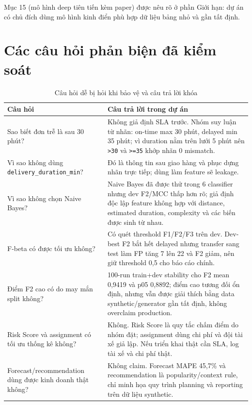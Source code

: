 \documentclass[12pt,a4paper,oneside]{report}
\newcommand{\code}[1]{\nolinkurl{#1}}
\begin{document}
Mục 15 (mô hình deep tiên tiến kèm paper) được nêu rõ ở phần Giới hạn: dự án có
chủ đích dùng mô hình kinh điển phù hợp dữ liệu bảng nhỏ và gần tất định.

\section{Các câu hỏi phản biện đã kiểm soát}

\begin{table}[H]
\centering
\small
\caption{Câu hỏi dễ bị hỏi khi bảo vệ và câu trả lời khóa}
\begin{tabularx}{\textwidth}{p{4.2cm}X}
\toprule
Câu hỏi & Câu trả lời trong dự án\\
\midrule
Sao biết đơn trễ là sau 30 phút? &
Không giả định SLA trước. Nhóm suy luận từ nhãn: on-time max 30 phút, delayed
min 35 phút; vì duration nằm trên lưới 5 phút nên \code{>30} và \code{>=35}
khớp nhãn 0 mismatch.\\
Vì sao không dùng \code{delivery\_duration\_min}? &
Đó là thông tin sau giao hàng và phục dựng nhãn trực tiếp; dùng làm feature sẽ
leakage.\\
Vì sao không chọn Naive Bayes? &
Naive Bayes đã được thử trong 6 classifier nhưng dev F2/MCC thấp hơn rõ; giả
định độc lập feature không hợp với distance, estimated duration, complexity và
các biến được sinh từ nhau.\\
F-beta có được tối ưu không? &
Có quét threshold F1/F2/F3 trên dev. Dev-best F2 bắt hết delayed nhưng transfer
sang test làm FP tăng 7 lên 22 và F2 giảm, nên giữ threshold 0,5 cho báo cáo
chính.\\
Điểm F2 cao có do may mắn split không? &
100-run train+dev stability cho F2 mean 0,9419 và p05 0,8892; điểm cao tương
đối ổn định, nhưng vẫn được giải thích bằng data synthetic/generator gần tất
định, không overclaim production.\\
Risk Score và assignment có tối ưu thống kê không? &
Không. Risk Score là quy tắc chấm điểm do nhóm đặt; assignment dùng chi phí và
đội tài xế giả lập. Nếu triển khai thật cần SLA, log tài xế và chi phí thật.\\
Forecast/recommendation dùng được kinh doanh thật không? &
Không claim. Forecast MAPE 45,7\% và recommendation là popularity/context rule,
chỉ minh họa quy trình planning và reporting trên dữ liệu synthetic.\\
\bottomrule
\end{tabularx}
\end{table}
\end{document}
